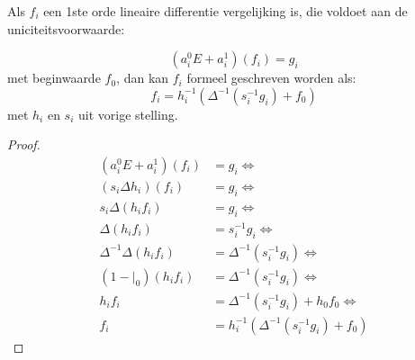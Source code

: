\documentclass[a4paper,12pt]{article}
\begin{document}


\begin{corollary}
    \label{oplo1}
    Als $f_i$ een 1ste orde lineaire differentie vergelijking is, die voldoet aan de uniciteitsvoorwaarde:

    $$
        (a_i^0E + a_i^1)(f_i) = g_i
    $$
    met beginwaarde $f_0$, dan kan $f_i$ formeel geschreven worden als:
    $$
        f_i= h_i^{-1} \left( \Delta^{-1} {\left( s_i^{-1} g_i \right)} + f_0 \right)
    $$
    met $h_i$ en $s_i$ uit vorige stelling.
\end{corollary}

\begin{proof}
    \begin{align*}
        (a_i^0E + a_i^1)(f_i)        & = g_i    \Leftrightarrow                                                   \\
        (s_i \Delta h_i)(f_i)        & =g_i     \Leftrightarrow                                                   \\
        s_i \Delta (h_i f_i)         & =g_i     \Leftrightarrow                                                   \\
        \Delta (h_i f_i)             & =s_i^{-1} g_i  \Leftrightarrow                                             \\
        \Delta^{-1} \Delta (h_i f_i) & = \Delta^{-1}  {\left( s_i^{-1} g_i \right)}               \Leftrightarrow \\
        (1 - |_0) (h_i f_i)          & = \Delta^{-1}  {\left( s_i^{-1} g_i \right)}               \Leftrightarrow \\
        h_i f_i                      & = \Delta^{-1}  {\left( s_i^{-1} g_i \right)} + h_0 f_0     \Leftrightarrow \\
        f_i                          & = h_i^{-1}\left( \Delta^{-1}  {\left( s_i^{-1} g_i \right)} + f_0 \right)
    \end{align*}
\end{proof}
\end{document}
